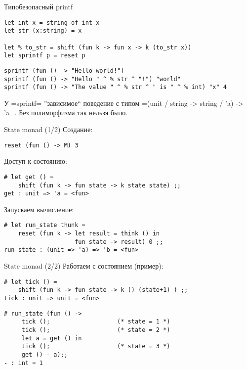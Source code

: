 \documentclass{beamer}
\begin{document}
\begin{frame}[fragile]{Типобезопасный printf}
\begin{lstlisting}[style={camlstyle1}]
let int x = string_of_int x
let str (x:string) = x

let % to_str = shift (fun k -> fun x -> k (to_str x))
let sprintf p = reset p
\end{lstlisting}
\begin{lstlisting}[style={camlstyle1}]
sprintf (fun () -> "Hello world!")
sprintf (fun () -> "Hello " ^ % str ^ "!") "world"
sprintf (fun () -> "The value " ^ % str ^ " is " ^ % int) "x" 4
\end{lstlisting} \vspace{1cm}

У \hsinline=sprintf= ''зависимое`` поведение с типом \camline=(unit / string -> string / 'a) -> 'a=. Без полиморфизма так нельзя было.
\end{frame}

\begin{frame}[fragile]{State monad (1/2)}
Создание:
\begin{lstlisting}[style={camlstyle1}]
reset (fun () -> M) 3
\end{lstlisting}
Доступ к состоянию:
\begin{lstlisting}[style={camlstyle1}]
# let get () =
    shift (fun k -> fun state -> k state state) ;;
get : unit => 'a = <fun>
\end{lstlisting}
Запускаем вычисление:
\begin{lstlisting}[style={camlstyle1}]
# let run_state thunk =
    reset (fun k -> let result = think () in
                    fun state -> result) 0 ;;
run_state : (unit => 'a) => 'b = <fun>
\end{lstlisting}

\end{frame} 



\begin{frame}[fragile]{State monad (2/2)}
Работаем с состоянием (пример):
\begin{lstlisting}[style={camlstyle1}]
# let tick () =
    shift (fun k -> fun state -> k () (state+1) ) ;;
tick : unit => unit = <fun>
\end{lstlisting}

\begin{lstlisting}[style={camlstyle1}]
# run_state (fun () ->
     tick ();                   (* state = 1 *)
     tick ();                   (* state = 2 *)
     let a = get () in
     tick ();                   (* state = 3 *)
     get () - a);;
- : int = 1
\end{lstlisting}
\end{frame}
\end{document}
